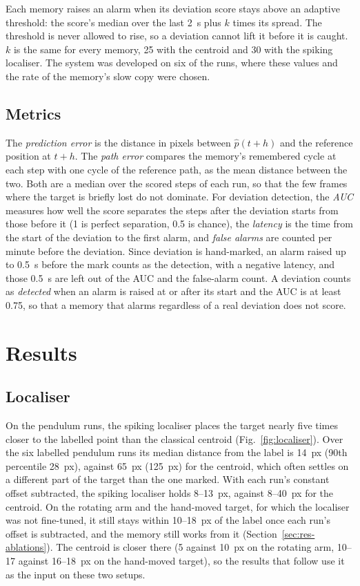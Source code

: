 \documentclass[conference]{IEEEtran}
\begin{document}
Each memory raises an alarm when its deviation score stays above an adaptive threshold: the score's median over the last 2~s plus $k$ times its spread. The threshold is never allowed to rise, so a deviation cannot lift it before it is caught. $k$ is the same for every memory, 25 with the centroid and 30 with the spiking localiser. The system was developed on six of the runs, where these values and the rate of the memory's slow copy were chosen.

\subsection{Metrics}
\label{sec:metrics}
The \emph{prediction error} is the distance in pixels between $\hat{p}(t+h)$ and the reference position at $t+h$. The \emph{path error} compares the memory's remembered cycle at each step with one cycle of the reference path, as the mean distance between the two. Both are a median over the scored steps of each run, so that the few frames where the target is briefly lost do not dominate. For deviation detection, the \emph{AUC} measures how well the score separates the steps after the deviation starts from those before it (1 is perfect separation, 0.5 is chance), the \emph{latency} is the time from the start of the deviation to the first alarm, and \emph{false alarms} are counted per minute before the deviation. Since deviation is hand-marked, an alarm raised up to 0.5~s before the mark counts as the detection, with a negative latency, and those 0.5~s are left out of the AUC and the false-alarm count. A deviation counts as \emph{detected} when an alarm is raised at or after its start and the AUC is at least 0.75, so that a memory that alarms regardless of a real deviation does not score.

\section{Results}
\label{sec:results}

\subsection{Localiser}
\label{sec:res-localiser}
On the pendulum runs, the spiking localiser places the target nearly five times closer to the labelled point than the classical centroid (Fig.~\ref{fig:localiser}). Over the six labelled pendulum runs its median distance from the label is 14~px (90th percentile 28~px), against 65~px (125~px) for the centroid, which often settles on a different part of the target than the one marked. With each run's constant offset subtracted, the spiking localiser holds 8--13~px, against 8--40~px for the centroid. On the rotating arm and the hand-moved target, for which the localiser was not fine-tuned, it still stays within 10--18~px of the label once each run's offset is subtracted, and the memory still works from it (Section~\ref{sec:res-ablations}). The centroid is closer there (5 against 10~px on the rotating arm, 10--17 against 16--18~px on the hand-moved target), so the results that follow use it as the input on these two setups.
\end{document}
